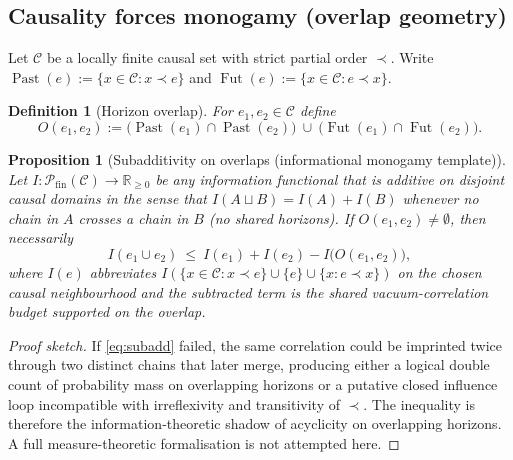 \documentclass[11pt]{amsart}
\newtheorem{proposition}[theorem]{Proposition}
\newtheorem{definition}[theorem]{Definition}
\begin{document}
\subsection{Causality forces monogamy (overlap geometry)}

Let \(\mathcal{C}\) be a locally finite causal set with strict partial order \(\prec\). Write \(\operatorname{Past}(e):=\{x\in\mathcal{C}:x\prec e\}\) and \(\operatorname{Fut}(e):=\{x\in\mathcal{C}:e\prec x\}\).

\begin{definition}[Horizon overlap]
\label{def:horizon-overlap}
For \(e_1,e_2\in\mathcal{C}\) define
\[
O(e_1,e_2):=\bigl(\operatorname{Past}(e_1)\cap \operatorname{Past}(e_2)\bigr)\ \cup\ \bigl(\operatorname{Fut}(e_1)\cap \operatorname{Fut}(e_2)\bigr).
\]
\end{definition}

\begin{proposition}[Subadditivity on overlaps (informational monogamy template)]
\label{prop:subadditivity-monogamy}
Let \(I:\mathcal{P}_{\mathrm{fin}}(\mathcal{C})\to \mathbb{R}_{\ge 0}\) be any information functional that is additive on \emph{disjoint} causal domains in the sense that \(I(A\sqcup B)=I(A)+I(B)\) whenever no chain in \(A\) crosses a chain in \(B\) (no shared horizons). If \(O(e_1,e_2)\neq\emptyset\), then necessarily
\begin{equation}
\label{eq:subadd}
I(e_1\cup e_2)\ \le\ I(e_1)+I(e_2)-I\bigl(O(e_1,e_2)\bigr),
\end{equation}
where \(I(e)\) abbreviates \(I(\{x\in\mathcal{C}:x\prec e\}\cup\{e\}\cup\{x:e\prec x\})\) on the chosen causal neighbourhood and the subtracted term is the shared vacuum-correlation budget supported on the overlap.
\end{proposition}

\begin{proof}[Proof sketch]
If \eqref{eq:subadd} failed, the same correlation could be imprinted twice through two distinct chains that later merge, producing either a logical double count of probability mass on overlapping horizons or a putative closed influence loop incompatible with irreflexivity and transitivity of \(\prec\). The inequality is therefore the information-theoretic shadow of acyclicity on overlapping horizons. A full measure-theoretic formalisation is not attempted here.
\end{proof}
\end{document}
